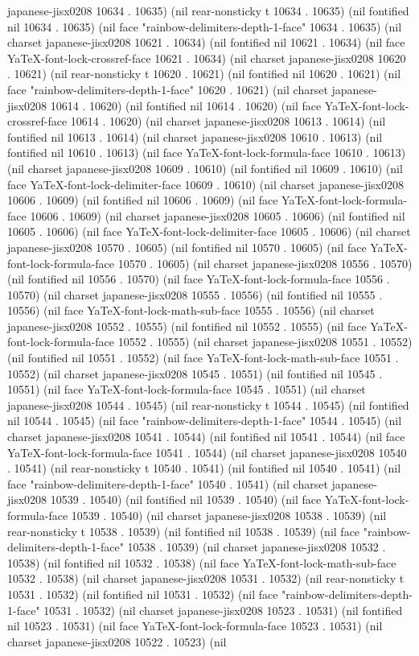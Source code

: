 japanese-jisx0208 10634 . 10635) (nil rear-nonsticky t 10634 . 10635) (nil fontified nil 10634 . 10635) (nil face "rainbow-delimiters-depth-1-face" 10634 . 10635) (nil charset japanese-jisx0208 10621 . 10634) (nil fontified nil 10621 . 10634) (nil face YaTeX-font-lock-crossref-face 10621 . 10634) (nil charset japanese-jisx0208 10620 . 10621) (nil rear-nonsticky t 10620 . 10621) (nil fontified nil 10620 . 10621) (nil face "rainbow-delimiters-depth-1-face" 10620 . 10621) (nil charset japanese-jisx0208 10614 . 10620) (nil fontified nil 10614 . 10620) (nil face YaTeX-font-lock-crossref-face 10614 . 10620) (nil charset japanese-jisx0208 10613 . 10614) (nil fontified nil 10613 . 10614) (nil charset japanese-jisx0208 10610 . 10613) (nil fontified nil 10610 . 10613) (nil face YaTeX-font-lock-formula-face 10610 . 10613) (nil charset japanese-jisx0208 10609 . 10610) (nil fontified nil 10609 . 10610) (nil face YaTeX-font-lock-delimiter-face 10609 . 10610) (nil charset japanese-jisx0208 10606 . 10609) (nil fontified nil 10606 . 10609) (nil face YaTeX-font-lock-formula-face 10606 . 10609) (nil charset japanese-jisx0208 10605 . 10606) (nil fontified nil 10605 . 10606) (nil face YaTeX-font-lock-delimiter-face 10605 . 10606) (nil charset japanese-jisx0208 10570 . 10605) (nil fontified nil 10570 . 10605) (nil face YaTeX-font-lock-formula-face 10570 . 10605) (nil charset japanese-jisx0208 10556 . 10570) (nil fontified nil 10556 . 10570) (nil face YaTeX-font-lock-formula-face 10556 . 10570) (nil charset japanese-jisx0208 10555 . 10556) (nil fontified nil 10555 . 10556) (nil face YaTeX-font-lock-math-sub-face 10555 . 10556) (nil charset japanese-jisx0208 10552 . 10555) (nil fontified nil 10552 . 10555) (nil face YaTeX-font-lock-formula-face 10552 . 10555) (nil charset japanese-jisx0208 10551 . 10552) (nil fontified nil 10551 . 10552) (nil face YaTeX-font-lock-math-sub-face 10551 . 10552) (nil charset japanese-jisx0208 10545 . 10551) (nil fontified nil 10545 . 10551) (nil face YaTeX-font-lock-formula-face 10545 . 10551) (nil charset japanese-jisx0208 10544 . 10545) (nil rear-nonsticky t 10544 . 10545) (nil fontified nil 10544 . 10545) (nil face "rainbow-delimiters-depth-1-face" 10544 . 10545) (nil charset japanese-jisx0208 10541 . 10544) (nil fontified nil 10541 . 10544) (nil face YaTeX-font-lock-formula-face 10541 . 10544) (nil charset japanese-jisx0208 10540 . 10541) (nil rear-nonsticky t 10540 . 10541) (nil fontified nil 10540 . 10541) (nil face "rainbow-delimiters-depth-1-face" 10540 . 10541) (nil charset japanese-jisx0208 10539 . 10540) (nil fontified nil 10539 . 10540) (nil face YaTeX-font-lock-formula-face 10539 . 10540) (nil charset japanese-jisx0208 10538 . 10539) (nil rear-nonsticky t 10538 . 10539) (nil fontified nil 10538 . 10539) (nil face "rainbow-delimiters-depth-1-face" 10538 . 10539) (nil charset japanese-jisx0208 10532 . 10538) (nil fontified nil 10532 . 10538) (nil face YaTeX-font-lock-math-sub-face 10532 . 10538) (nil charset japanese-jisx0208 10531 . 10532) (nil rear-nonsticky t 10531 . 10532) (nil fontified nil 10531 . 10532) (nil face "rainbow-delimiters-depth-1-face" 10531 . 10532) (nil charset japanese-jisx0208 10523 . 10531) (nil fontified nil 10523 . 10531) (nil face YaTeX-font-lock-formula-face 10523 . 10531) (nil charset japanese-jisx0208 10522 . 10523) (nil 